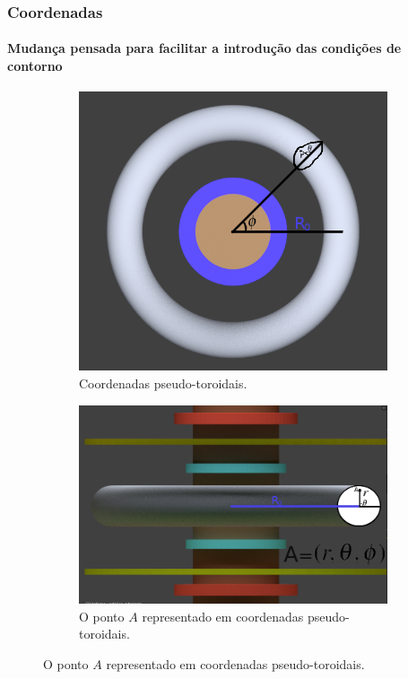\documentclass[aspectratio=169]{beamer}
\begin{document}
\begin{frame}
		\frametitle{Coordenadas}
		\framesubtitle{Mudança pensada para facilitar a introdução das condições de contorno}
	
		\begin{figure}[H]
			\centering
			
			\begin{subfigure}{0.45\textwidth}
				\centering
				\includegraphics[width=.9\linewidth]{pseudotoridal1.png}
				\caption{Coordenadas pseudo-toroidais.} 
			\end{subfigure}
			\hfill
			\begin{subfigure}{0.45\textwidth}
				\centering
				\includegraphics[width=.9\linewidth]{pseudotoridal2.png}
				\caption{O ponto $A$ representado em coordenadas pseudo-toroidais.} 
			\end{subfigure}                                                   
			
		\end{figure}	
	\end{frame}
\end{document}
